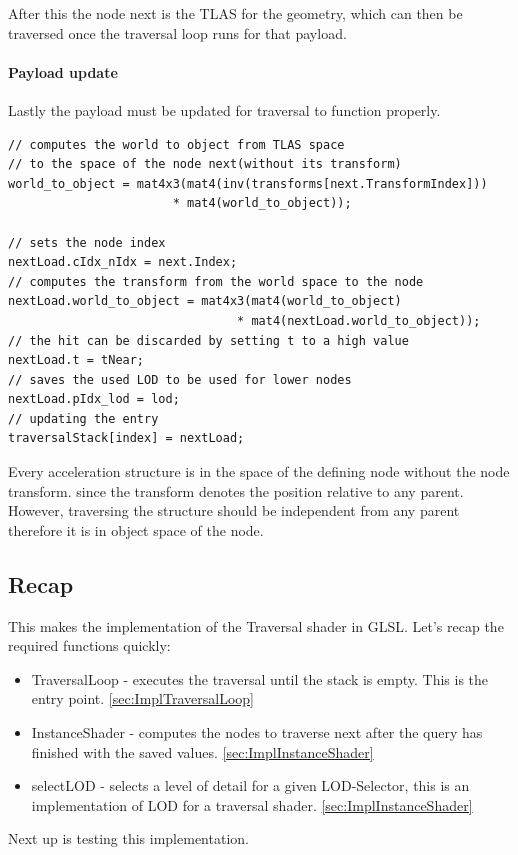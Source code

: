 After this the node next is the TLAS for the geometry, which can then be traversed once the traversal loop runs for that payload.
\newpage
\paragraph{Payload update}
Lastly the payload must be updated for traversal to function properly.
\begin{lstlisting}
// computes the world to object from TLAS space 
// to the space of the node next(without its transform)
world_to_object = mat4x3(mat4(inv(transforms[next.TransformIndex])) 
                       * mat4(world_to_object));

// sets the node index
nextLoad.cIdx_nIdx = next.Index;
// computes the transform from the world space to the node
nextLoad.world_to_object = mat4x3(mat4(world_to_object) 
                                * mat4(nextLoad.world_to_object));
// the hit can be discarded by setting t to a high value
nextLoad.t = tNear;
// saves the used LOD to be used for lower nodes
nextLoad.pIdx_lod = lod;
// updating the entry
traversalStack[index] = nextLoad;
\end{lstlisting}

Every acceleration structure is in the space of the defining node without the node transform. since the transform denotes the position relative to any parent. However, traversing the structure should be independent from any parent therefore it is in object space of the node.

\subsection{Recap}
This makes the implementation of the Traversal shader in GLSL. Let's recap the required functions quickly:
\begin{itemize}
    \item TraversalLoop - executes the traversal until the stack is empty. This is the entry point. \ref{sec:ImplTraversalLoop}
    \item InstanceShader - computes the nodes to traverse next after the query has finished with the saved values. \ref{sec:ImplInstanceShader}
    \item selectLOD - selects a level of detail for a given LOD-Selector, this is an implementation of LOD for a traversal shader. \ref{sec:ImplInstanceShader}
\end{itemize}
Next up is testing this implementation.

